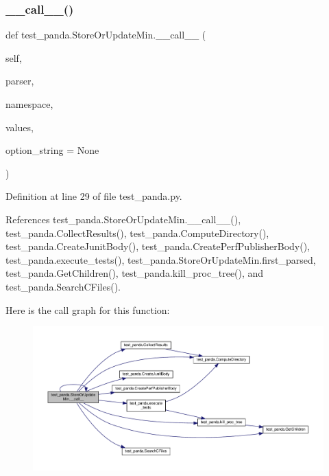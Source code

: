 \subsubsection{\texorpdfstring{\+\_\+\+\_\+call\+\_\+\+\_\+()}{\_\_call\_\_()}\hspace{0.1cm}{\footnotesize\ttfamily [1/3]}}
{\footnotesize\ttfamily def test\+\_\+panda.\+Store\+Or\+Update\+Min.\+\_\+\+\_\+call\+\_\+\+\_\+ (\begin{DoxyParamCaption}\item[{}]{self,  }\item[{}]{parser,  }\item[{}]{namespace,  }\item[{}]{values,  }\item[{}]{option\+\_\+string = {\ttfamily None} }\end{DoxyParamCaption})}



Definition at line 29 of file test\+\_\+panda.\+py.



References test\+\_\+panda.\+Store\+Or\+Update\+Min.\+\_\+\+\_\+call\+\_\+\+\_\+(), test\+\_\+panda.\+Collect\+Results(), test\+\_\+panda.\+Compute\+Directory(), test\+\_\+panda.\+Create\+Junit\+Body(), test\+\_\+panda.\+Create\+Perf\+Publisher\+Body(), test\+\_\+panda.\+execute\+\_\+tests(), test\+\_\+panda.\+Store\+Or\+Update\+Min.\+first\+\_\+parsed, test\+\_\+panda.\+Get\+Children(), test\+\_\+panda.\+kill\+\_\+proc\+\_\+tree(), and test\+\_\+panda.\+Search\+C\+Files().

Here is the call graph for this function\+:
\nopagebreak
\begin{figure}[H]
\begin{center}
\leavevmode
\includegraphics[width=350pt]{db/dd8/classtest__panda_1_1StoreOrUpdateMin_af8b0342a587abe4ea380c333ebe3dc73_cgraph}
\end{center}
\end{figure}
\mbox{\label{classtest__panda_1_1StoreOrUpdateMin_af8b0342a587abe4ea380c333ebe3dc73}} 
